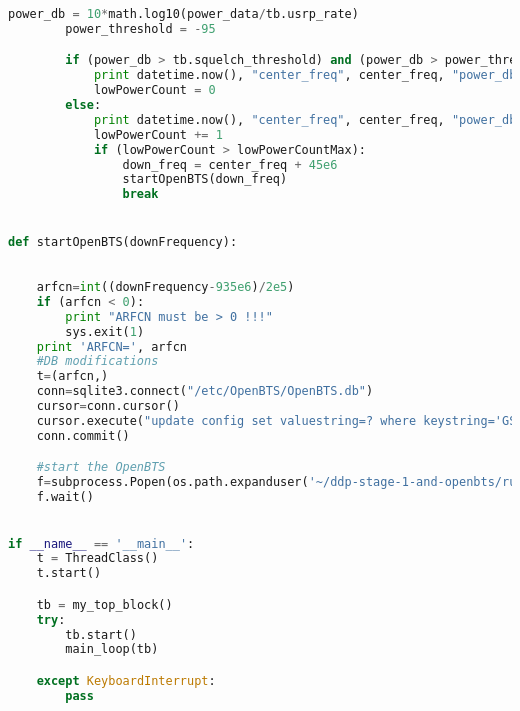 \begin{lstlisting}[language=Python]
        power_db = 10*math.log10(power_data/tb.usrp_rate)
        power_threshold = -95

        if (power_db > tb.squelch_threshold) and (power_db > power_threshold):
            print datetime.now(), "center_freq", center_freq, "power_db", power_db, "in use"
            lowPowerCount = 0
        else:
            print datetime.now(), "center_freq", center_freq, "power_db", power_db
            lowPowerCount += 1
            if (lowPowerCount > lowPowerCountMax):
                down_freq = center_freq + 45e6
                startOpenBTS(down_freq)
                break


def startOpenBTS(downFrequency):            
    
    
    arfcn=int((downFrequency-935e6)/2e5)
    if (arfcn < 0):
        print "ARFCN must be > 0 !!!"
        sys.exit(1)
    print 'ARFCN=', arfcn
    #DB modifications
    t=(arfcn,)
    conn=sqlite3.connect("/etc/OpenBTS/OpenBTS.db")
    cursor=conn.cursor()
    cursor.execute("update config set valuestring=? where keystring='GSM.Radio.C0'",t)
    conn.commit()

    #start the OpenBTS
    f=subprocess.Popen(os.path.expanduser('~/ddp-stage-1-and-openbts/runOpenBTS.sh'))
    f.wait()
	          

if __name__ == '__main__':
    t = ThreadClass()
    t.start()

    tb = my_top_block()
    try:
        tb.start()
        main_loop(tb)

    except KeyboardInterrupt:
        pass


\end{lstlisting}
